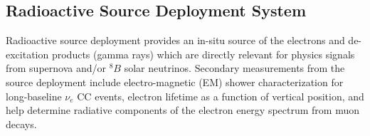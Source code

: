 \subsection{Radioactive Source Deployment System}%
\label{sec:calibrs}

Radioactive source deployment provides an in-situ source of the electrons and de-excitation products (gamma rays) which are directly relevant for physics signals from supernova and/or $^{8}B$ solar neutrinos. Secondary measurements from the source deployment include electro-magnetic (EM) shower characterization for long-baseline $\nu_e$ CC events, electron lifetime as a function of  vertical position, and help determine radiative components of the electron energy spectrum from muon decays.




